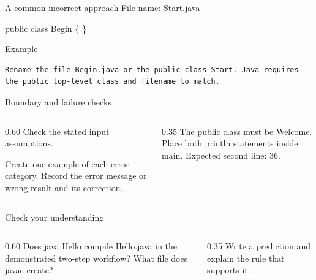 \documentclass[10pt,aspectratio=169]{beamer}
\begin{document}
\begin{frame}[fragile,t]{A common incorrect approach}
File name: Start.java\par public class Begin \{ \}
\vspace{1mm}\begin{block}{Example}
\begin{lstlisting}
Rename the file Begin.java or the public class Start. Java requires the public top-level class and filename to match.
\end{lstlisting}
\end{block}
\end{frame}

\begin{frame}[fragile,t]{Boundary and failure checks}
\begin{columns}[T,onlytextwidth]\begin{column}{0.60\textwidth}
Check the stated input assumptions.

Create one example of each error category. Record the error message or wrong result and its correction.
\end{column}\begin{column}{0.35\textwidth}\small
The public class must be Welcome. Place both println statements inside main. Expected second line: 36.
\end{column}\end{columns}
\end{frame}

\begin{frame}[fragile,t]{Check your understanding}
\begin{columns}[T,onlytextwidth]\begin{column}{0.60\textwidth}
Does java Hello compile Hello.java in the demonstrated two-step workflow? What file does javac create?
\end{column}\begin{column}{0.35\textwidth}\small
Write a prediction and explain the rule that supports it.
\end{column}\end{columns}
\end{frame}
\end{document}
